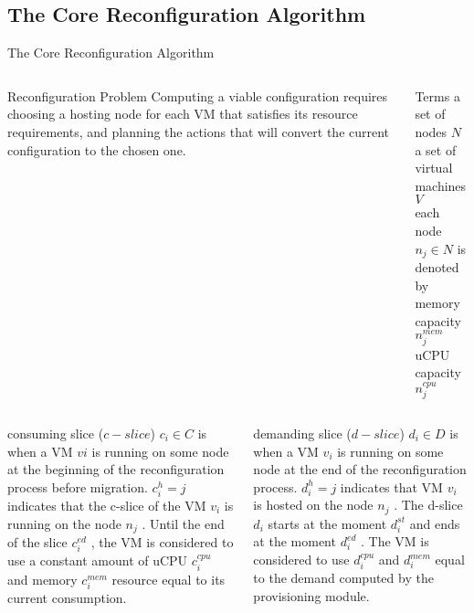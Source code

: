 \subsection{The Core Reconfiguration Algorithm}
\begin{frame}[shrink=5]{The Core Reconfiguration Algorithm}

\begin{columns}[t]
\begin{block}{Reconfiguration Problem}
Computing a viable configuration requires choosing a hosting node for each
VM that satisfies its resource requirements, and planning the actions that will
convert the current configuration to the chosen one.
\end{block}
\pause{}

\begin{block}{Terms}
a set of nodes $N$ \\
a set of virtual machines $V$ \\
each node $n_j \in N$ is denoted by \\
memory capacity $n^{mem}_j $ \\
uCPU capacity $n^{cpu}_j$
\end{block}
\end{columns}
\pause{}

\begin{columns}[t]
\begin{block}{consuming slice ($c-slice$)}
$c_i \in C$ is when a VM $vi$ is running
on some node at the beginning of the reconfiguration process before migration.
$c^h_i = j$ indicates that the c-slice of the VM $v_i$ is running on the
node $n_j$ . Until the end of the slice $c^{ed}_i$ ,
the VM is considered to use a constant amount of uCPU $c^{cpu}_i$ and memory $c^{mem}_i$
resource equal to its current consumption.
\end{block}
\pause{}

\begin{block}{demanding slice ($d-slice$)}
$d_i \in D$ is when a VM $v_i$ is running
on some node at the end of the reconfiguration process. $d^h_i = j$
indicates that VM $v_i$ is hosted on the node $n_j$ . 
The d-slice $d_i$ starts at the moment $d^{st}_i$ and 
ends at the moment $d^{ed}_i$ . The VM is considered
to use $d^{cpu}_i$ and $d^{mem}_i$ equal to the demand computed by the provisioning module.

\end{block}
\end{columns}

\end{frame} 

